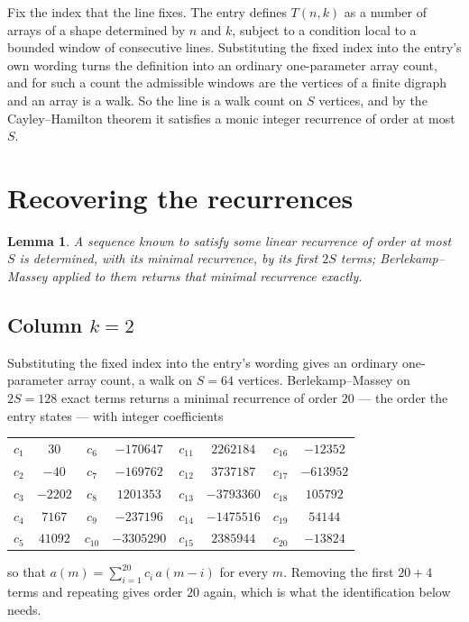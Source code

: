 \documentclass[11pt,a4paper]{article}
\theoremstyle{plain}
\newtheorem{lemma}[theorem]{Lemma}
\theoremstyle{definition}
\begin{document}
Fix the index that the line fixes. The entry defines $T(n,k)$ as a number of arrays of a shape
determined by $n$ and $k$, subject to a condition local to a bounded window of consecutive
lines. Substituting the fixed index into the entry's own wording turns the definition into an
ordinary one-parameter array count, and for such a count the admissible windows are the
vertices of a finite digraph and an array is a walk. So the line is a walk count on $S$
vertices, and by the Cayley--Hamilton theorem it satisfies a monic integer recurrence of order
at most $S$.

\section{Recovering the recurrences}

\begin{lemma}\label{lem:bm}
A sequence known to satisfy some linear recurrence of order at most $S$ is determined, with its
minimal recurrence, by its first $2S$ terms; Berlekamp--Massey applied to them returns that
minimal recurrence exactly.
\end{lemma}

\subsection*{Column $k=2$}
Substituting the fixed index into the entry's wording gives an ordinary one-parameter array
count, a walk on $S=64$ vertices. Berlekamp--Massey on $2S=128$ exact terms
returns a minimal recurrence of order $20$ --- the order the entry states --- with
integer coefficients
\begin{center}\small\begin{tabular}{cccccccc}
$c_{1}$ & $30$ & $c_{6}$ & $-170647$ & $c_{11}$ & $2262184$ & $c_{16}$ & $-12352$ \\
$c_{2}$ & $-40$ & $c_{7}$ & $-169762$ & $c_{12}$ & $3737187$ & $c_{17}$ & $-613952$ \\
$c_{3}$ & $-2202$ & $c_{8}$ & $1201353$ & $c_{13}$ & $-3793360$ & $c_{18}$ & $105792$ \\
$c_{4}$ & $7167$ & $c_{9}$ & $-237196$ & $c_{14}$ & $-1475516$ & $c_{19}$ & $54144$ \\
$c_{5}$ & $41092$ & $c_{10}$ & $-3305290$ & $c_{15}$ & $2385944$ & $c_{20}$ & $-13824$ \\
\end{tabular}\end{center}
so that $a(m)=\sum_{i=1}^{20}c_i\,a(m-i)$ for every $m$. Removing the first
$20+4$ terms and repeating gives order $20$ again, which is what the
identification below needs.
\end{document}
